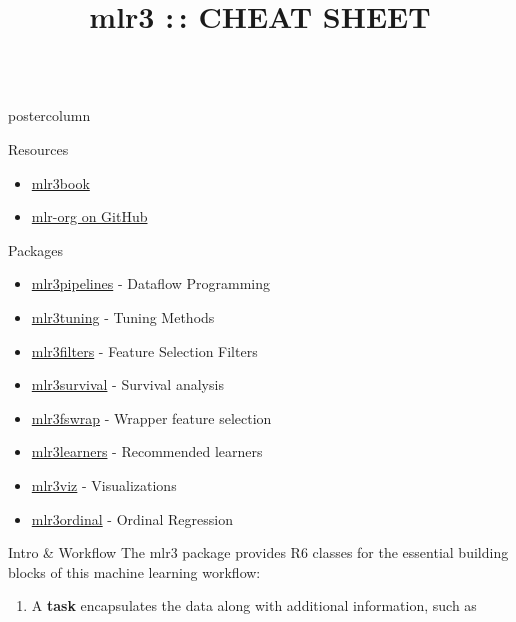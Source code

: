 \documentclass{beamer}
\title{mlr3 :\,: CHEAT SHEET} %
\newlength{\columnheight} %
\begin{document}
\begin{frame}[fragile]{}
\begin{columns}
	\begin{column}{.245\textwidth}
		\begin{beamercolorbox}[center]{postercolumn}
			\begin{minipage}{.98\textwidth}
				\parbox[t][\columnheight]{\textwidth}{
					\begin{myblock}{Resources}
						\begin{itemize}
							\item \href{https://mlr3book.mlr-org.com/index.html}{mlr3book}
							\item \href{https://github.com/mlr-org}{mlr-org on GitHub} 
						\end{itemize}
					\end{myblock}
						\begin{myblock}{Packages}
										\vfill
						\begin{itemize}
							\item \href{https://github.com/mlr-org/mlr3pipelines}{mlr3pipelines} - Dataflow Programming
							\item \href{https://github.com/mlr-org/mlr3tuning}{mlr3tuning} - Tuning Methods
							\item \href{https://github.com/mlr-org/mlr3filters}{mlr3filters} - Feature Selection Filters
							\item \href{https://github.com/mlr-org/mlr3survival}{mlr3survival} - Survival analysis
							\item \href{https://github.com/mlr-org/mlr3fswrap}{mlr3fswrap} - Wrapper feature selection
							\item \href{https://github.com/mlr-org/mlr3learners}{mlr3learners} - Recommended learners
							\item \href{https://github.com/mlr-org/mlr3viz}{mlr3viz} - Visualizations
							\item \href{https://github.com/mlr-org/mlr3ordinal}{mlr3ordinal} - Ordinal Regression
						\end{itemize}
					\end{myblock}
					\begin{myblock}{Intro \& Workflow}
					The mlr3 package provides R6 classes for the essential building
					blocks of this machine learning workflow:
					\begin{enumerate}
						\item A \textbf{task} encapsulates the data along with additional information, such as 

\end{enumerate}
\end{myblock}}
\end{minipage}
\end{beamercolorbox}
\end{column}
\end{columns}
\end{frame}
\end{document}
